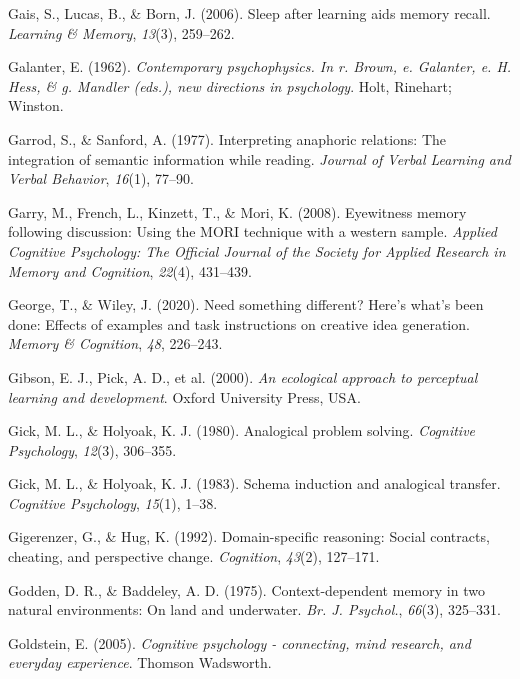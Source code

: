 \documentclass[
]{krantz}
\newlength{\cslhangindent}
\newenvironment{CSLReferences}[2] %
 {\begin{list}{}{%
  \setlength{\itemindent}{0pt}
  \setlength{\leftmargin}{0pt}
  \setlength{\parsep}{0pt}
  \ifodd #1
   \setlength{\leftmargin}{\cslhangindent}
   \setlength{\itemindent}{-1\cslhangindent}
  \fi
  \setlength{\itemsep}{#2\baselineskip}}}
 {\end{list}}
\begin{document}
\begin{CSLReferences}{1}{0}
Gais, S., Lucas, B., \& Born, J. (2006). Sleep after learning aids memory recall. \emph{Learning \& Memory}, \emph{13}(3), 259--262.

Galanter, E. (1962). \emph{Contemporary psychophysics. In r. Brown, e. Galanter, e. H. Hess, \& g. Mandler (eds.), new directions in psychology}. Holt, Rinehart; Winston.

Garrod, S., \& Sanford, A. (1977). Interpreting anaphoric relations: The integration of semantic information while reading. \emph{Journal of Verbal Learning and Verbal Behavior}, \emph{16}(1), 77--90.

Garry, M., French, L., Kinzett, T., \& Mori, K. (2008). Eyewitness memory following discussion: Using the MORI technique with a western sample. \emph{Applied Cognitive Psychology: The Official Journal of the Society for Applied Research in Memory and Cognition}, \emph{22}(4), 431--439.

George, T., \& Wiley, J. (2020). Need something different? Here's what's been done: Effects of examples and task instructions on creative idea generation. \emph{Memory \& Cognition}, \emph{48}, 226--243.

Gibson, E. J., Pick, A. D., et al. (2000). \emph{An ecological approach to perceptual learning and development}. Oxford University Press, USA.

Gick, M. L., \& Holyoak, K. J. (1980). Analogical problem solving. \emph{Cognitive Psychology}, \emph{12}(3), 306--355.

Gick, M. L., \& Holyoak, K. J. (1983). Schema induction and analogical transfer. \emph{Cognitive Psychology}, \emph{15}(1), 1--38.

Gigerenzer, G., \& Hug, K. (1992). Domain-specific reasoning: Social contracts, cheating, and perspective change. \emph{Cognition}, \emph{43}(2), 127--171.

Godden, D. R., \& Baddeley, A. D. (1975). Context-dependent memory in two natural environments: On land and underwater. \emph{Br. J. Psychol.}, \emph{66}(3), 325--331.

Goldstein, E. (2005). \emph{Cognitive psychology - connecting, mind research, and everyday experience}. Thomson Wadsworth.


\end{CSLReferences}
\end{document}
